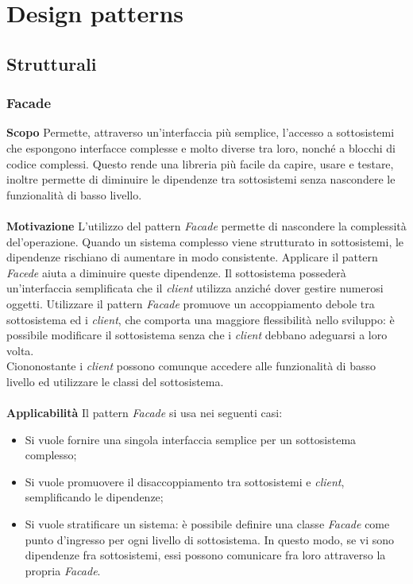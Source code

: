 \newpage
\section{Design patterns}

\subsection{Strutturali}
\subsubsection{Facade}
\textbf{Scopo}	Permette, attraverso un'interfaccia più semplice, l'accesso a sottosistemi che espongono interfacce complesse e molto diverse tra loro, nonché a blocchi di codice complessi. Questo rende una libreria più facile da capire, usare e testare, inoltre permette di diminuire le dipendenze tra sottosistemi senza nascondere le funzionalità di basso livello.
\\\\
\textbf{Motivazione}	L'utilizzo del pattern \textit{Facade} permette di nascondere la complessità del'operazione. Quando un sistema complesso viene strutturato in sottosistemi, le dipendenze rischiano di aumentare in modo consistente. Applicare il pattern \textit{Facede} aiuta a diminuire queste dipendenze. Il sottosistema possederà un'interfaccia semplificata che il \textit{client} utilizza anziché dover gestire numerosi oggetti. Utilizzare il pattern \textit{Facade} promuove un accoppiamento debole tra sottosistema ed i \textit{client}, che comporta una maggiore flessibilità nello sviluppo: è possibile modificare il sottosistema senza che i \textit{client} debbano adeguarsi a loro volta. \\
Ciononostante i \textit{client} possono comunque accedere alle funzionalità di basso livello ed utilizzare le classi del sottosistema.
\\\\
\textbf{Applicabilità}	Il pattern \textit{Facade} si usa nei seguenti casi:
	\begin{itemize}
		\item Si vuole fornire una singola interfaccia semplice per un sottosistema complesso;
		\item Si vuole promuovere il disaccoppiamento tra sottosistemi e \textit{client}, semplificando le dipendenze;
		\item Si vuole stratificare un sistema: è possibile definire una classe \textit{Facade} come punto d'ingresso per ogni livello di sottosistema. In questo modo, se vi sono dipendenze fra sottosistemi, essi possono comunicare fra loro attraverso la propria \textit{Facade}.
	\end{itemize}
	
